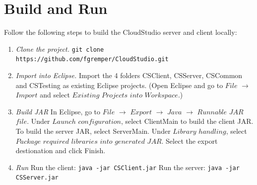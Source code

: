 \section{Build and Run}

Follow the following steps to build the CloudStudio server and client locally:

\begin{enumerate}


\item \emph{Clone the project.} \newline
\texttt{git clone https://github.com/fgremper/CloudStudio.git}
\item \emph{Import into Eclipse.} \newline Import the 4 folders CSClient, CSServer, CSCommon and CSTesting as existing Eclipse projects. (Open Eclipse and go to $File$ $\rightarrow$ $Import$ and select $Existing$ $Projects$ $into$ $Workspace$.)
\item \emph{Build JAR} \newline
In Eclipse, go to $File$ $\rightarrow$ $Export$ $\rightarrow$ $Java$ $\rightarrow$ $Runnable$ $JAR$ $file$.
Under $Launch$ $configuration$, select ClientMain to build the client JAR. To build the server JAR, select ServerMain. Under $Library$ $handling$, select $Package$ $required$ $libraries$ $into$ $generated$ $JAR$.
Select the export destionation and click Finish.
\item \emph{Run} \newline
Run the client:
\texttt{java -jar CSClient.jar} \newline
Run the server:
\texttt{java -jar CSServer.jar}

\end{enumerate}
